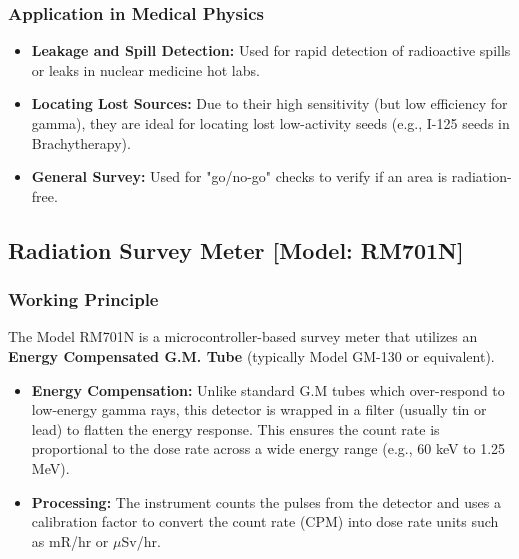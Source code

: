 \subsubsection{Application in Medical Physics}
\begin{itemize}
    \item \textbf{Leakage and Spill Detection:} Used for rapid detection of radioactive spills or leaks in nuclear medicine hot labs.
    \item \textbf{Locating Lost Sources:} Due to their high sensitivity (but low efficiency for gamma), they are ideal for locating lost low-activity seeds (e.g., I-125 seeds in Brachytherapy).
    \item \textbf{General Survey:} Used for "go/no-go" checks to verify if an area is radiation-free.
\end{itemize}



\subsection{Radiation Survey Meter [Model: RM701N]}

\subsubsection{Working Principle}
The Model RM701N is a microcontroller-based survey meter that utilizes an \textbf{Energy Compensated G.M. Tube} (typically Model GM-130 or equivalent).
\begin{itemize}
    \item \textbf{Energy Compensation:} Unlike standard G.M tubes which over-respond to low-energy gamma rays, this detector is wrapped in a filter (usually tin or lead) to flatten the energy response. This ensures the count rate is proportional to the dose rate across a wide energy range (e.g., 60 keV to 1.25 MeV).
    \item \textbf{Processing:} The instrument counts the pulses from the detector and uses a calibration factor to convert the count rate (CPM) into dose rate units such as mR/hr or $\mu$Sv/hr.
\end{itemize}

